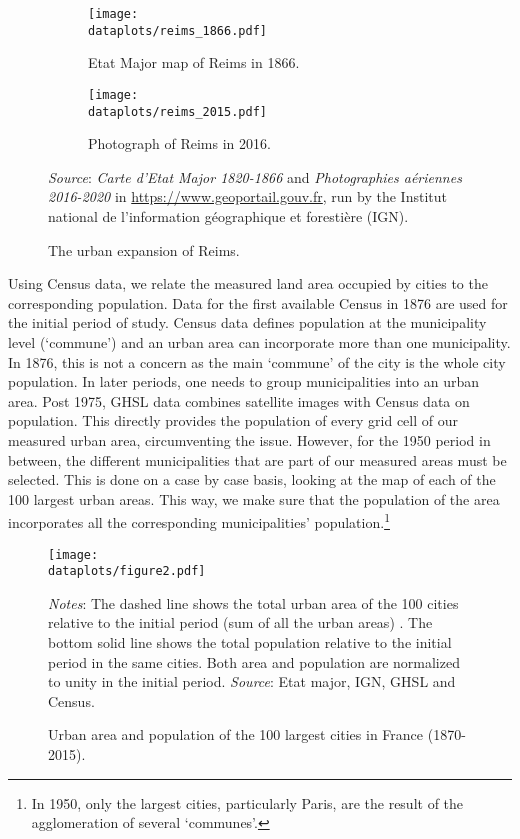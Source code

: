 \documentclass[./20250130-paper.tex]{subfiles}
\begin{document}
\begin{figure}
	\begin{subfigure}{0.5\textwidth}
		\texttt{[image: \\dataplots/reims\_1866.pdf]}
		\caption{Etat Major map of Reims in 1866.\label{fig:reims1866}
		}
	\end{subfigure}%
	\hspace{5mm}
	\begin{subfigure}{0.5\textwidth}
		\texttt{[image: \\dataplots/reims\_2015.pdf]}
		\caption{Photograph of Reims in 2016.\label{fig:reims2015}}
	\end{subfigure}
	\caption{The urban expansion of Reims.}
	{\footnotesize \textit{Source}: \emph{Carte d'Etat Major 1820-1866} and \emph{Photographies aériennes 2016-2020} in \url{https://www.geoportail.gouv.fr}, run by the Institut national de l’information géographique et forestière (IGN).}
\end{figure}


Using Census data, we relate the measured land area occupied by cities to the corresponding population. Data for the first available Census in 1876 are used for the initial period of study. Census data defines population at the municipality level (`commune') and an urban area can incorporate more than one municipality. In 1876, this is not a concern as the main `commune' of the city is the whole city population. In later periods, one needs to group municipalities into an urban area.  Post 1975, GHSL data combines satellite images with Census data on population. This directly provides the population of every grid cell of our measured urban area, circumventing the issue. However, for the 1950 period in between, the different municipalities that are part of our measured areas must be selected. This is done on a case by case basis, looking at the map of each of the 100 largest urban areas. This way, we make sure that the population of the area incorporates all the corresponding municipalities' population.\footnote{In 1950, only the largest cities, particularly Paris, are the result of the agglomeration of several `communes'.}  

\begin{figure}[p]	
	\begin{center}
		\texttt{[image: \\dataplots/figure2.pdf]}
	\end{center}
	\vspace{-0.5cm}
	\caption{Urban area and population of the 100 largest cities in France (1870-2015).\label{fig:areapop}
	}
	{\footnotesize \textit{Notes}: The dashed line shows the total urban area of the 100 cities relative to the initial period (sum of all the urban areas) . The bottom solid line shows the total population relative to the initial period in the same cities. Both area and population are normalized to unity in the initial period. 
		\textit{Source}:  Etat major, IGN, GHSL and Census.}%
\end{figure}
\end{document}
